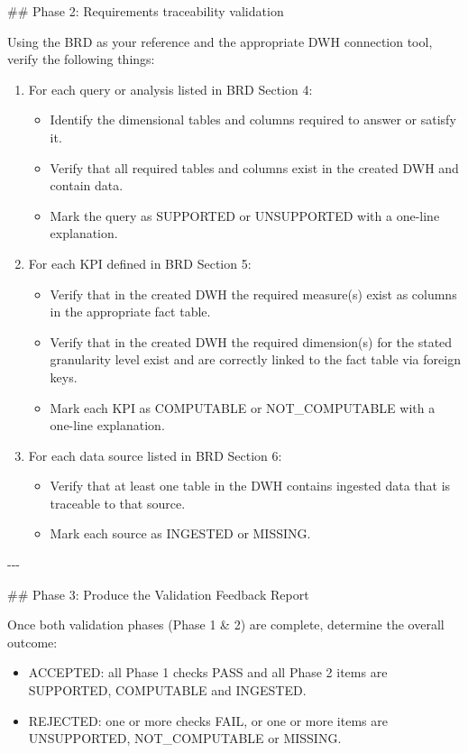 \#\# Phase 2: Requirements traceability validation
\newline

Using the BRD as your reference and the appropriate DWH connection tool, verify the following things:
\begin{enumerate}
    \item For each query or analysis listed in BRD Section 4:
    \begin{itemize}
        \item Identify the dimensional tables and columns required to answer or satisfy it.
        \item Verify that all required tables and columns exist in the created DWH and contain data.
        \item Mark the query as SUPPORTED or UNSUPPORTED with a one-line explanation.
    \end{itemize}
    \item For each KPI defined in BRD Section 5:
    \begin{itemize}
        \item Verify that in the created DWH the required measure(s) exist as columns in the appropriate fact table.
        \item Verify that in the created DWH the required dimension(s) for the stated granularity level exist and are correctly linked to the fact table via foreign keys.
        \item Mark each KPI as COMPUTABLE or NOT\_COMPUTABLE with a one-line explanation.
    \end{itemize}
    \item For each data source listed in BRD Section 6:
    \begin{itemize}
        \item Verify that at least one table in the DWH contains ingested data that is traceable to that source.
        \item Mark each source as INGESTED or MISSING.
    \end{itemize}
\end{enumerate}

-{}-{}-
\newline

\#\# Phase 3: Produce the Validation Feedback Report
\newline

Once both validation phases (Phase 1 \& 2) are complete, determine the overall outcome:
\begin{itemize}
    \item ACCEPTED: all Phase 1 checks PASS and all Phase 2 items are SUPPORTED, COMPUTABLE and INGESTED.
    \item REJECTED: one or more checks FAIL, or one or more items are UNSUPPORTED, NOT\_COMPUTABLE or MISSING.
\end{itemize}

